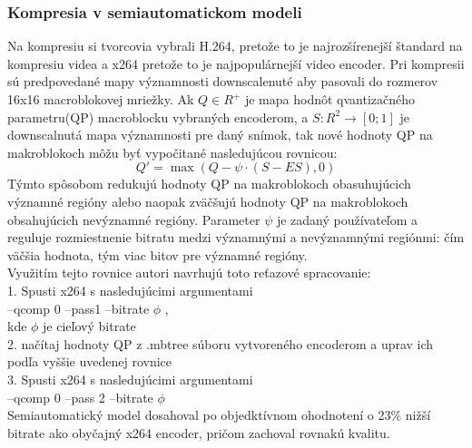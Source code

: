 \documentclass[10pt,twoside,slovak,a4paper]{article}
\begin{document}
\subsubsection{Kompresia v semiautomatickom modeli}
Na kompresiu si tvorcovia\cite{Coplien:MPD} vybrali H.264, pretože to je najrozšírenejší štandard na kompresiu videa a x264 pretože to je najpopulárnejší video encoder. Pri kompresii sú predpovedané mapy významnosti downscalenuté aby pasovali do rozmerov 16x16 macroblokovej mriežky. Ak  \(Q \in R^+\) je mapa hodnôt qvantizačného parametru(QP) macroblocku vybraných encoderom, a \(S : R^2\rightarrow [0;1]\) je downscalnutá mapa významnosti pre daný snímok, tak nové hodnoty QP na makroblokoch môžu byť vypočitané nasledujúcou rovnicou:
\[{Q}' = \max(Q - \psi \cdot (S - ES),0)\]
Týmto spôsobom redukujú hodnoty QP na makroblokoch obasuhujúcich významné regióny alebo naopak zväčšujú hodnoty QP na makroblokoch obsahujúcich nevýznamné regióny. Parameter \(\psi\) je zadaný používateľom a reguluje rozmiestnenie bitratu medzi významnými a nevýznamnými regiónmi: čím väčšia hodnota, tým viac bitov pre významné regióny.\\
Využitím tejto rovnice autori\cite{Coplien:MPD} navrhujú toto reťazové spracovanie:\\
1. Spusti x264 s nasledujúcimi argumentami\\
--qcomp 0 --pass1 --bitrate \( \phi\) ,\\
kde \( \phi\) je cieľový bitrate\\
2. načítaj hodnoty QP z .mbtree súboru vytvoreného encoderom a uprav ich podľa vyššie uvedenej rovnice \\
3. Spusti x264 s nasledujúcimi argumentami\\
--qcomp 0 --pass 2 --bitrate \(\phi\)\\
Semiautomatický model dosahoval po objedktívnom ohodnotení o 23\% nižší bitrate ako obyčajný x264 encoder, pričom zachoval rovnakú kvalitu.
\end{document}
